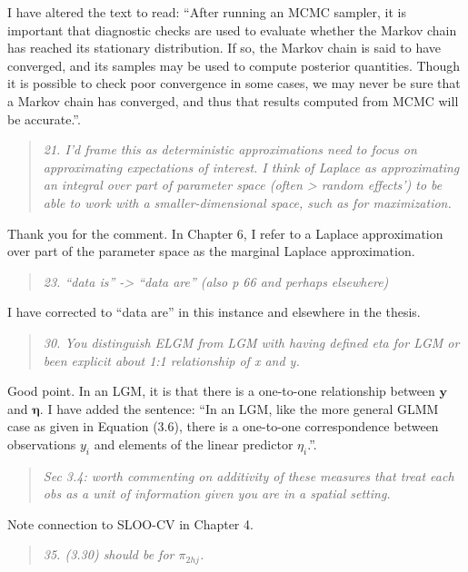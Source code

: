 \documentclass[
  12pt,
]{article}
\begin{document}
I have altered the text to read: ``After running an MCMC sampler, it is
important that diagnostic checks are used to evaluate whether the Markov
chain has reached its stationary distribution. If so, the Markov chain
is said to have converged, and its samples may be used to compute
posterior quantities. Though it is possible to check poor convergence in
some cases, we may never be sure that a Markov chain has converged, and
thus that results computed from MCMC will be accurate.''.

\begin{quote}
\emph{21. I'd frame this as deterministic approximations need to focus
on approximating expectations of interest. I think of Laplace as
approximating an integral over part of parameter space (often
\textgreater{} random effects') to be able to work with a
smaller-dimensional space, such as for maximization.}
\end{quote}

Thank you for the comment. In Chapter 6, I refer to a Laplace
approximation over part of the parameter space as the marginal Laplace
approximation.

\begin{quote}
\emph{23. ``data is'' -\textgreater{} ``data are'' (also p 66 and
perhaps elsewhere)}
\end{quote}

I have corrected to ``data are'' in this instance and elsewhere in the
thesis.

\begin{quote}
\emph{30. You distinguish ELGM from LGM with having defined eta for LGM
or been explicit about 1:1 relationship of x and y.}
\end{quote}

Good point. In an LGM, it is that there is a one-to-one relationship
between \(\mathbf{y}\) and \(\boldsymbol{\mathbf{\eta}}\). I have added
the sentence: ``In an LGM, like the more general GLMM case as given in
Equation (3.6), there is a one-to-one correspondence between
observations \(y_i\) and elements of the linear predictor \(\eta_i\).''.

\begin{quote}
\emph{Sec 3.4: worth commenting on additivity of these measures that
treat each obs as a unit of information given you are in a spatial
setting.}
\end{quote}

Note connection to SLOO-CV in Chapter 4.

\begin{quote}
\emph{35. (3.30) should be for \(\pi_{2hj}\).}
\end{quote}
\end{document}
